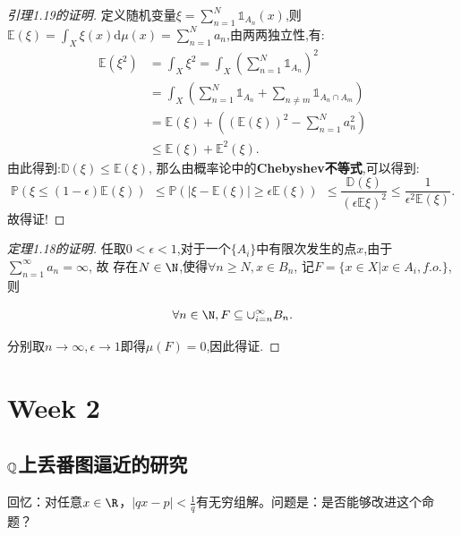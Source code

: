 \begin{proof}[引理1.19的证明]
   定义随机变量$\xi = \sum_{n=1}^N \mathbb{1}_{A_n}(x)$,则$\mathbb{E}(\xi) = \int_{X} \xi(x)\mathrm{d}\mu(x) = \sum_{n=1}^N a_n$,由两两独立性,有:
   \begin{align}
    \mathbb{E}(\xi^2) &= \int_X \xi^2 = \int_X (\sum_{n=1}^N \mathbb{1}_{A_n})^2 \\
    &= \int_X (\sum_{n=1}^N \mathbb{1}_{A_n} + \sum_{n\neq m}\mathbb{1}_{A_n\cap A_m}) \\
    &= \mathbb{E}(\xi) + ((\mathbb{E}(\xi))^2 - \sum_{n=1}^N a_n^2) \\
    &\leq \mathbb{E}(\xi) + \mathbb{E}^2(\xi).
   \end{align}
   由此得到:$\mathbb{D}(\xi) \leq \mathbb{E}(\xi)$,
   那么由概率论中的\textbf{Chebyshev不等式},可以得到:
   $$\mathbb{P}(\xi \leq (1-\epsilon) \mathbb{E}(\xi)) \ \ \leq \mathbb{P} (|\xi-\mathbb{E}(\xi)| \geq \epsilon \mathbb{E}(\xi)) \ \ \leq \frac{\mathbb{D}(\xi)}{(\epsilon\mathbb{E}\xi)^2} \leq \frac{1}{\epsilon^2 \mathbb{E}(\xi)}.$$
   故得证!
\end{proof}
\begin{proof}[定理1.18的证明]
    任取$0<\epsilon<1$,对于一个$\{A_i\}$中有限次发生的点$x$,由于$\sum_{n=1}^{\infty} a_n = \infty$, 故
    存在$N\in\N$,使得$\forall n\geq N, x\in B_n$, 记$F = \{x \in X| x \in A_i, f.o.\}$,则
    
    $$\displaystyle \forall n\in \N, F \subseteq \cup_{i=n}^{\infty}B_n.$$

    分别取$n\to \infty , \epsilon \to 1$即得$\mu(F) = 0$,因此得证.
\end{proof}
\section{Week 2}
\subsection{$\mathbb{Q}$上丢番图逼近的研究}
回忆：对任意$x \in \R$，$\displaystyle |qx-p|<\frac{1}{q}$有无穷组解。问题是：是否能够改进这个命题？

